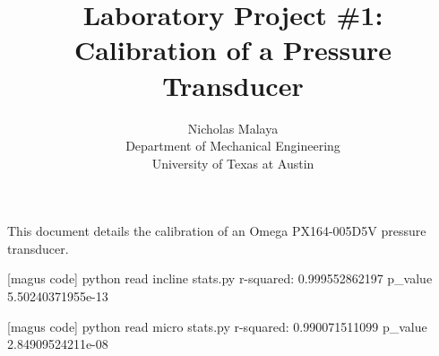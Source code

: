 \documentclass{article}
\title{\bf{Laboratory Project \#1: Calibration of a Pressure Transducer}}
\author{Nicholas Malaya \\ Department of Mechanical Engineering \\ University of Texas at Austin} \date{}
\begin{document}
\maketitle

This document details the calibration of an Omega PX164-005D5V pressure transducer. 

[magus code] python read incline stats.py 
r-squared: 0.999552862197
p\_value 5.50240371955e-13

[magus code] python read micro stats.py 
r-squared: 0.990071511099
p\_value 2.84909524211e-08
\end{document}
